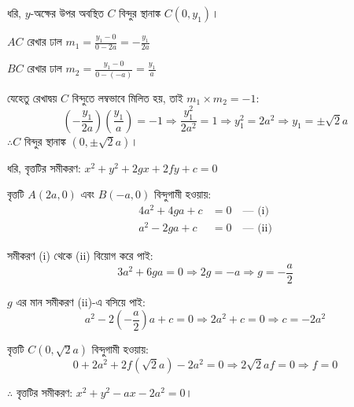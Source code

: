 \documentclass[12pt, a4paper]{article}
\begin{document}
\begin{tcolorbox}[solutionbox={সমাধান (Solution)}]
    \noindent
    ধরি, $y$-অক্ষের উপর অবস্থিত $C$ বিন্দুর স্থানাঙ্ক $C(0, y_1)$।
    
    \vspace{0.5em}
    $AC$ রেখার ঢাল $m_1 = \frac{y_1 - 0}{0 - 2a} = -\frac{y_1}{2a}$
    
    \vspace{0.5em}
    $BC$ রেখার ঢাল $m_2 = \frac{y_1 - 0}{0 - (-a)} = \frac{y_1}{a}$
    
    \vspace{0.5em}
    যেহেতু রেখাদ্বয় $C$ বিন্দুতে লম্বভাবে মিলিত হয়, তাই $m_1 \times m_2 = -1$:
    \[ \left(-\frac{y_1}{2a}\right) \left(\frac{y_1}{a}\right) = -1 \Rightarrow \frac{y_1^2}{2a^2} = 1 \Rightarrow y_1^2 = 2a^2 \Rightarrow y_1 = \pm\sqrt{2}a \]
    $\therefore C$ বিন্দুর স্থানাঙ্ক $(0, \pm\sqrt{2}a)$।
    
    \vspace{0.5em}
    ধরি, বৃত্তটির সমীকরণ: $x^2 + y^2 + 2gx + 2fy + c = 0$
    
    \vspace{0.5em}
    বৃত্তটি $A(2a, 0)$ এবং $B(-a, 0)$ বিন্দুগামী হওয়ায়:
    \begin{align}
        4a^2 + 4ga + c &= 0 \quad \text{--- (i)} \\
        a^2 - 2ga + c &= 0 \quad \text{--- (ii)}
    \end{align}
    
    \vspace{0.5em}
    সমীকরণ (i) থেকে (ii) বিয়োগ করে পাই:
    \[ 3a^2 + 6ga = 0 \Rightarrow 2g = -a \Rightarrow g = -\frac{a}{2} \]
    
    \vspace{0.5em}
    $g$ এর মান সমীকরণ (ii)-এ বসিয়ে পাই:
    \[ a^2 - 2\left(-\frac{a}{2}\right)a + c = 0 \Rightarrow 2a^2 + c = 0 \Rightarrow c = -2a^2 \]
    
    \vspace{0.5em}
    বৃত্তটি $C(0, \sqrt{2}a)$ বিন্দুগামী হওয়ায়:
    \[ 0 + 2a^2 + 2f(\sqrt{2}a) - 2a^2 = 0 \Rightarrow 2\sqrt{2}af = 0 \Rightarrow f = 0 \]
    
    \vspace{0.5em}
    $\therefore$ বৃত্তটির সমীকরণ: $x^2 + y^2 - ax - 2a^2 = 0$।
\end{tcolorbox}

\vspace{2em}
\end{document}
